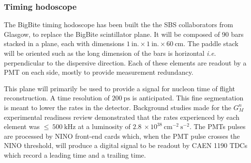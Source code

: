 \subsubsection{Timing hodoscope}

The BigBite timing hodoscope has been built the the SBS collaborators from Glasgow, to replace the BigBite scintillator plane.
It will be composed of 90 bars stacked in a plane, each with dimensions $1~\mathrm{in.}\times1~\mathrm{in.}\times60~\mathrm{cm}$. The paddle stack will be oriented such as the long dimension of the bars is horizontal {\it i.e.} perpendicular to the dispersive direction.
Each of these elements are readout by a PMT on each side, mostly to provide measurement redundancy.

This plane will primarily be used to provide a signal for nucleon time of flight reconstruction. A time resolution of $200~\mathrm{ps}$ is anticipated.
This fine segmentation is meant to lower the rates in the detector. Background studies made for the $G_M^n$ experimental readiness review \cite{gmn_err} demonstrated that the rates experienced by each element was $\leq~500~\mathrm{kHz}$ at a luminosity of $2.8~\times10^{38}~\mathrm{cm}^{-2}~\mathrm{s}^{-2}$. %
The PMTs pulses are processed by NINO front-end cards which, when the PMT pulse crosses the NINO threshold, will produce a digital signal to be readout by CAEN 1190 TDCs which record a leading time and a trailing time.

